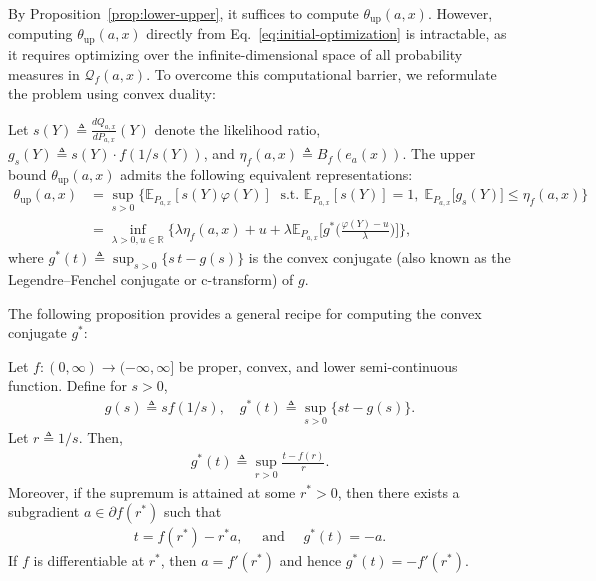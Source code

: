 By Proposition~\ref{prop:lower-upper}, it suffices to compute $\theta_{\mathrm{up}}(a,x)$. However, computing $\theta_{\mathrm{up}}(a,x)$ directly from Eq.~\eqref{eq:initial-optimization} is intractable, as it requires optimizing over the infinite-dimensional space of all probability measures in $\mathcal{Q}_f(a,x)$. To overcome this computational barrier, we reformulate the problem using convex duality:
\begin{theorem}\label{thm:representation-bound}
    \normalfont
    Let $s(Y) \triangleq \tfrac{dQ_{a,x}}{dP_{a,x}}(Y)$ denote the likelihood ratio, $g_s(Y) \triangleq s(Y)\cdot f(1/s(Y))$, and $\eta_f(a,x) \triangleq B_f(e_a(x))$. The upper bound $\theta_{\mathrm{up}}(a,x)$ admits the following equivalent representations: 
    \begin{align}
        \theta_{\mathrm{up}}(a,x) & = \sup_{s > 0}\Big\{ \mathbb{E}_{P_{a,x}}[s(Y) \varphi(Y)]\; \text{ s.t. } \mathbb{E}_{P_{a,x}}[s(Y)] = 1, \;  \mathbb{E}_{P_{a,x}}\big[g_s(Y)] \leq \eta_f(a,x)   \Big\} \label{eq:primal} \\ 
                &= \inf_{\lambda > 0, u \in \mathbb{R}}\big\{ \lambda \eta_f(a,x)  + u +  \lambda\mathbb{E}_{P_{a,x}}\Big[ g^{\ast}\big(\tfrac{\varphi(Y) - u}{\lambda}\big)\Big] \big\}, \label{eq:dual}
    \end{align}
    where $g^\ast(t) \triangleq \sup_{s > 0}\{s\,t - g(s) \}$ is the convex conjugate (also known as the Legendre–Fenchel conjugate or c-transform) of $g$.
\end{theorem}
The following proposition provides a general recipe for computing the convex conjugate $g^{\ast}$:

\begin{proposition}\label{prop:convex-conjugate-unified}
    \normalfont
    Let $f:(0,\infty)\to (-\infty,\infty]$ be proper, convex, and lower semi-continuous function. Define for $s > 0$, 
    \begin{align}
        g(s) \triangleq s f(1/s), \quad g^{\ast}(t) \triangleq \sup_{s>0}\{st - g(s)\}. 
    \end{align}
    Let $r \triangleq 1/s$. Then, 
    \begin{align}
        g^{\ast}(t) \triangleq \sup_{r > 0} \frac{t-f(r)}{r}.
    \end{align}
    Moreover, if the supremum is attained at some $r^{\ast} > 0$, then there exists a subgradient $a \in \partial f(r^{\ast})$ such that 
    \begin{align}
        t = f(r^{\ast}) - r^{\ast}a, \quad \text{ and } \quad g^{\ast}(t) = -a. 
    \end{align}
    If $f$ is differentiable at $r^{\ast}$, then $a = f'(r^{\ast})$ and hence $g^{\ast}(t) = -f'(r^{\ast})$. 
\end{proposition}

